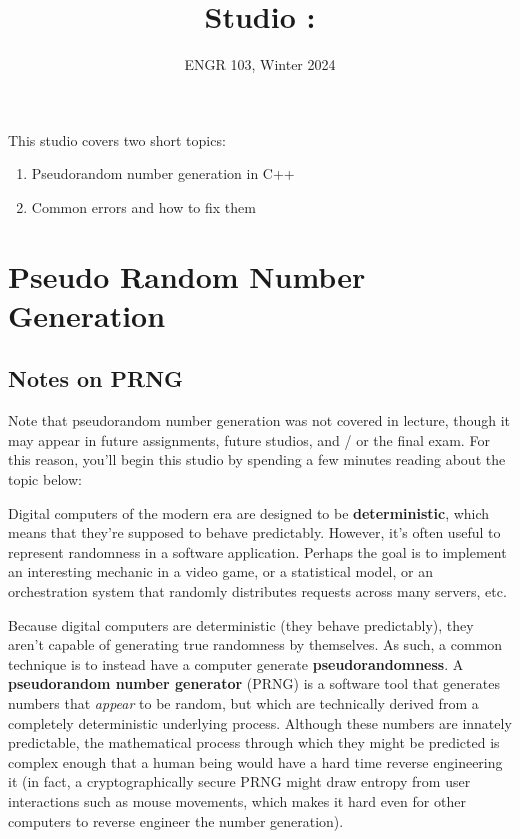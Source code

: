 \documentclass{article}
\title{
    Studio \studionumber: \studiotitle
}
\author{ENGR 103, Winter 2024}
\date{}
\begin{document}
\maketitle

This studio covers two short topics:

\begin{enumerate}
    \item Pseudorandom number generation in C++
    \item Common errors and how to fix them
\end{enumerate}

\section{Pseudo Random Number Generation}

\subsection{Notes on PRNG}

Note that pseudorandom number generation was not covered in lecture, though it may appear in future assignments, future studios, and / or the final exam. For this reason, you'll begin this studio by spending a few minutes reading about the topic below:

Digital computers of the modern era are designed to be \textbf{deterministic}, which means that they're supposed to behave predictably. However, it's often useful to represent randomness in a software application. Perhaps the goal is to implement an interesting mechanic in a video game, or a statistical model, or an orchestration system that randomly distributes requests across many servers, etc.

Because digital computers are deterministic (they behave predictably), they aren't capable of generating true randomness by themselves. As such, a common technique is to instead have a computer generate \textbf{pseudorandomness}. A \textbf{pseudorandom number generator} (PRNG) is a software tool that generates numbers that \textit{appear} to be random, but which are technically derived from a completely deterministic underlying process. Although these numbers are innately predictable, the mathematical process through which they might be predicted is complex enough that a human being would have a hard time reverse engineering it (in fact, a cryptographically secure PRNG might draw entropy from user interactions such as mouse movements, which makes it hard even for other computers to reverse engineer the number generation).
\end{document}
